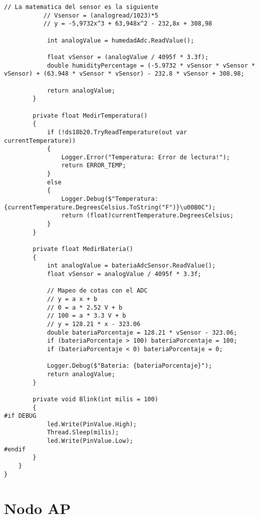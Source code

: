 \begin{lstlisting}[caption={Ejemplo de código en C\#}]
           // La matematica del sensor es la siguiente
           // Vsensor = (analogread/1023)*5
           // y = -5,9732x^3 + 63,948x^2 - 232,8x + 308,98 
        
            int analogValue = humedadAdc.ReadValue();

            float vSensor = (analogValue / 4095f * 3.3f);
            double humidityPercentage = (-5.9732 * vSensor * vSensor * vSensor) + (63.948 * vSensor * vSensor) - 232.8 * vSensor + 308.98;

            return analogValue;
        }

        private float MedirTemperatura()
        {
            if (!ds18b20.TryReadTemperature(out var currentTemperature))
            {
                Logger.Error("Temperatura: Error de lectura!");
                return ERROR_TEMP;
            }
            else
            {
                Logger.Debug($"Temperatura: {currentTemperature.DegreesCelsius.ToString("F")}\u00B0C");
                return (float)currentTemperature.DegreesCelsius;
            }
        }

        private float MedirBateria()
        {
            int analogValue = bateriaAdcSensor.ReadValue();
            float vSensor = analogValue / 4095f * 3.3f;

            // Mapeo de cotas con el ADC
            // y = a x + b
            // 0 = a * 2.52 V + b
            // 100 = a * 3.3 V + b
            // y = 128.21 * x - 323.06
            double bateriaPorcentaje = 128.21 * vSensor - 323.06;
            if (bateriaPorcentaje > 100) bateriaPorcentaje = 100;
            if (bateriaPorcentaje < 0) bateriaPorcentaje = 0;

            Logger.Debug($"Bateria: {bateriaPorcentaje}");
            return analogValue;
        }

        private void Blink(int milis = 100)
        {
#if DEBUG
            led.Write(PinValue.High);
            Thread.Sleep(milis);
            led.Write(PinValue.Low);
#endif
        }
    }
}

\end{lstlisting}

\section{Nodo AP}

